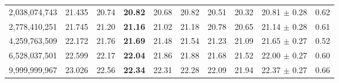 \begin{tabular}{rr ccc ccc c c}
2{,}038{,}074{,}743 & 21.435 & 20.74 & \textbf{20.82} & 20.68 & 20.82 & 20.51 & 20.32 & 20.81 $\pm$ 0.28 & 0.62 \\
2{,}778{,}410{,}251 & 21.745 & 21.20 & \textbf{21.16} & 21.02 & 21.18 & 20.78 & 20.65 & 21.14 $\pm$ 0.28 & 0.61 \\
4{,}259{,}763{,}509 & 22.172 & 21.76 & \textbf{21.69} & 21.48 & 21.54 & 21.23 & 21.09 & 21.65 $\pm$ 0.27 & 0.52 \\
6{,}528{,}037{,}501 & 22.599 & 22.17 & \textbf{22.04} & 21.86 & 21.88 & 21.68 & 21.52 & 22.00 $\pm$ 0.27 & 0.60 \\
9{,}999{,}999{,}967 & 23.026 & 22.56 & \textbf{22.34} & 22.31 & 22.28 & 22.09 & 21.94 & 22.37 $\pm$ 0.27 & 0.66 \\
\bottomrule
\end{tabular}